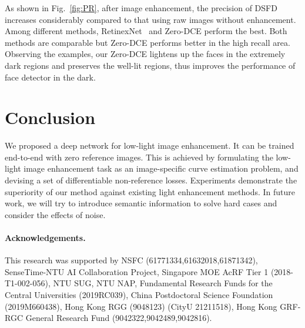 \documentclass[10pt,twocolumn,letterpaper]{article}
\begin{document}
As shown in Fig.~\ref{fig:PR}, after image enhancement, the precision of DSFD~\cite{DSFD} increases considerably compared to that using raw images without enhancement. Among different methods, RetinexNet~\cite{Chen2018} and Zero-DCE perform the best. Both methods are comparable but Zero-DCE performs better in the high recall area. Observing the examples, our Zero-DCE lightens up the faces in the extremely dark regions and preserves the well-lit regions, thus improves the performance of face detector in the dark.














\vspace{-8pt}
\section{Conclusion}
\vspace{-6pt}
We proposed a deep network for low-light image enhancement. It can be trained end-to-end with zero reference images. This is achieved by formulating the low-light image enhancement task as an image-specific curve estimation problem, and devising a set of differentiable non-reference losses. Experiments demonstrate the superiority of our method against existing light enhancement methods. In future work, we will try to introduce semantic information to solve hard cases and consider the effects of noise.

\vspace{-10pt}
\paragraph{Acknowledgements.}
\footnotesize{This research was supported by NSFC (61771334,61632018,61871342), SenseTime-NTU AI Collaboration Project, Singapore MOE AcRF Tier 1 (2018-T1-002-056), NTU SUG, NTU NAP, Fundamental Research Funds for the Central Universities (2019RC039), China Postdoctoral Science Foundation (2019M660438), Hong Kong RGG (9048123) (CityU 21211518), Hong Kong GRF-RGC General Research Fund (9042322,9042489,9042816).}


{\small


}
\end{document}
